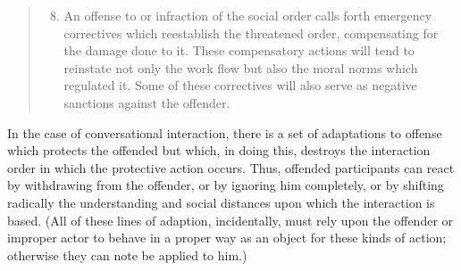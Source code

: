 \documentclass[twoside,symmetric,nobib,justified]{tufte-book}
\begin{document}
\begin{quote}
\begin{enumerate}
\setcounter{enumi}{7}
\item
  An offense to or infraction of the social order calls forth emergency
  correctives which reestablish the threatened order, compensating for
  the damage done to it. These compensatory actions will tend to
  reinstate not only the work flow but also the moral norms which
  regulated it. Some of these correctives will also serve as negative
  sanctions against the offender.
\end{enumerate}
\end{quote}

\noindent In the case of conversational interaction, there is a set of adaptations
to offense which protects the offended but which, in doing this,
destroys the interaction order in which the protective action occurs.
Thus, offended participants can react by withdrawing from the offender,
or by ignoring him completely, or by shifting radically the
understanding and social distances upon which the interaction is based.
(All of these lines of adaption, incidentally, must rely upon the
offender or improper actor to behave in a proper way as an object for
these kinds of action; otherwise they can note be applied to him.)
\end{document}
